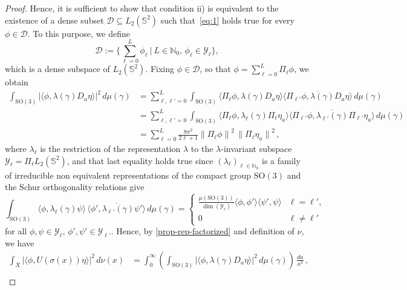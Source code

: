\documentclass[a4paper,11pt,DIV=11,%
abstract=on%
]{scrartcl}
\def\SO{{\mathrm{SO}}}
\def\N{{\mathbb N}}
\begin{document}
\begin{proof}
	Hence, it is sufficient to show that condition ii) is equivalent to the existence of a dense
	subset $\mathcal D\subseteq L_2(\mathbb S^2)$ such that~\eqref{eq:1} holds true for every
	$\phi\in \mathcal D$.
	To this purpose, we define 
	\[\mathcal D :=\Biggl\{ \sum_{\ell=0}^L \phi_\ell \ \Big|\ 
	L\in \N_0,\,\phi_\ell \in\mathcal Y_\ell\Biggr\} ,\]
	which is a dense subspace of $L_2(\mathbb S^2)$.  Fixing $\phi\in\mathcal D$, so that
	$\phi= \sum_{\ell=0}^L \Pi_\ell \phi$,  we obtain
	\begin{align*}
		\int_{\SO(3)}\bigl|\bigl\langle\phi,\lambda(\gamma)D_a\eta\bigr\rangle\bigr|^2\,d\mu(\gamma)
		&= \sum_{\ell,\ell'=0}^L\int_{\SO(3)}
		\bigl\langle\Pi_\ell\phi,\lambda(\gamma)D_a\eta\bigr\rangle
		\overline{\bigl\langle\Pi_{\ell'} \phi,\lambda(\gamma)D_a\eta\bigr\rangle}
		\,d\mu(\gamma)\\
		&= \sum_{\ell,\ell'=0}^L\int_{\SO(3)}
		\bigl\langle\Pi_\ell\phi,\lambda_\ell (\gamma) \Pi_\ell \eta_a\bigr\rangle
		\overline{\bigl\langle\Pi_{\ell'} \phi,
			\lambda_{\ell'}(\gamma)\Pi_{\ell'}\eta_a\bigr\rangle }
		\,d\mu(\gamma)\\
		&=  \sum_{\ell=0}^L \frac{8\pi^2}{2\ell+1}
		\bigl\lVert{\Pi_{\ell}\phi\bigr\rVert}^2\,\bigl\lVert{\Pi_{\ell}\eta_a\bigr\rVert}^2 \,,
	\end{align*}
	where $\lambda_\ell$ is the restriction of the representation $\lambda$ to the
	$\lambda$-invariant subspace $\mathcal Y_\ell=\Pi_\ell L_2(\mathbb S^2)$, and that last equality
	holds true since $(\lambda_\ell)_{\ell\in\N_0}$ is a family of 
	irreducible non equivalent representations of the compact group $\SO(3)$
	and the Schur orthogonality relations give
	\[
	\int_{\SO(3)}  
	\bigl\langle \phi,\lambda_\ell (\gamma) \psi \bigr\rangle\,
	\overline{\bigl\langle\phi',\lambda_{\ell'}(\gamma)\psi' \bigr\rangle} \,d\mu(\gamma)
	=\begin{cases}
		\frac{\mu(\SO(3))}{\operatorname{dim}(\mathcal Y_\ell)}
		\langle \phi,\phi' \rangle \langle \psi',\psi \rangle & \ell=\ell', \\
		0 & \ell\neq \ell'
	\end{cases}
	\]
	for all $\phi,\psi\in\mathcal Y_\ell$, $\phi',\psi'\in\mathcal Y_{\ell'}$. 
	Hence, by \eqref{prop-rep-factorized}  and definition of  $\nu$, we have 
	\begin{align}
		\int_X\bigl|\bigl\langle\phi,U(\sigma(x))\eta\bigr\rangle\bigr|^2\,d\nu(x)
		&=\int_0^\infty\left(\int_{\SO(3)}
		\bigl|\bigl\langle\phi,\lambda(\gamma)D_a\eta\bigr\rangle\bigr|^2\,d\mu(\gamma)\right)
		\,\frac{da}{a^3}\,,\\

\end{align}
\end{proof}
\end{document}
